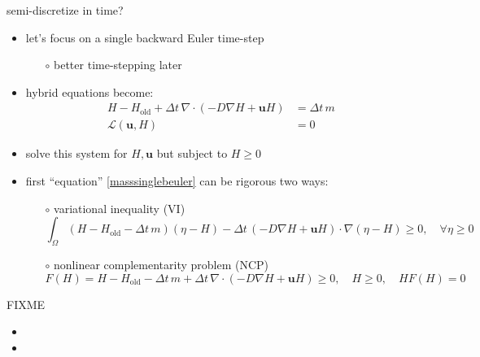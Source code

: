 \documentclass[hide notes,intlimits,usenames,dvipsnames]{beamer}
\newcommand{\Div}{\nabla\cdot}
\newcommand{\grad}{\nabla}
\begin{document}
\begin{frame}{semi-discretize in time?}
\begin{itemize}
\item let's focus on a single backward Euler time-step
    \begin{itemize}
    \item[$\circ$] better time-stepping later
    \end{itemize}
\item hybrid equations become:
        \begin{align}
        H - H_{\mathrm{old}} + \Delta t\, \Div (-D \grad H + \mathbf{u} H) &= \Delta t\, m \label{masssinglebeuler} \\
        \mathcal{L}(\mathbf{u},H) &= 0
        \end{align}
\item solve this system for $H,\mathbf{u}$ but subject to $H \ge 0$
\item first ``equation'' \eqref{masssinglebeuler} can be rigorous two ways:
    \begin{itemize}
    \item[$\circ$] variational inequality (VI) \scriptsize
        $$\int_\Omega (H - H_{\mathrm{old}} -\Delta t\, m) (\eta - H) - \Delta t\, (-D \grad H + \mathbf{u} H) \cdot \grad(\eta - H) \ge 0, \quad \forall \eta \ge 0$$ \normalsize
    \item[$\circ$] nonlinear complementarity problem (NCP) \scriptsize
        $$F(H) = H - H_{\mathrm{old}} -\Delta t\, m + \Delta t\,\Div (-D \grad H + \mathbf{u} H) \ge 0, \quad H \ge 0, \quad H F(H) = 0$$
    \end{itemize}
\end{itemize}
\end{frame}


\begin{frame}{FIXME}
\begin{itemize}
\item 
\item 
\end{itemize}
\end{frame}
\end{document}
